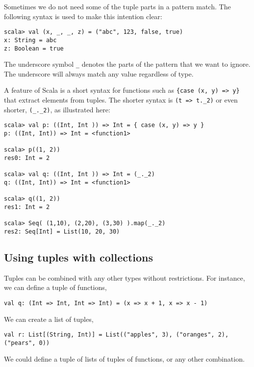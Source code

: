 Sometimes we do not need some of the tuple parts in a pattern match.
The following syntax is used to make this intention clear:
\begin{lstlisting}
scala> val (x, _, _, z) = ("abc", 123, false, true)
x: String = abc
z: Boolean = true
\end{lstlisting}
The underscore symbol \lstinline!_!
denotes the parts of the pattern that we want to ignore. The underscore
will always match any value regardless of type.

A feature of Scala is a short syntax for functions such as \lstinline!{case (x, y) => y}!
that extract elements from tuples. The shorter syntax is \lstinline!(t => t._2)!
or even shorter, \lstinline!(_._2)!,
as illustrated here:
\begin{lstlisting}
scala> val p: ((Int, Int )) => Int = { case (x, y) => y }
p: ((Int, Int)) => Int = <function1>

scala> p((1, 2))
res0: Int = 2

scala> val q: ((Int, Int )) => Int = (_._2)
q: ((Int, Int)) => Int = <function1>

scala> q((1, 2))
res1: Int = 2

scala> Seq( (1,10), (2,20), (3,30) ).map(_._2)
res2: Seq[Int] = List(10, 20, 30)
\end{lstlisting}

\subsection{Using tuples with collections}

Tuples can be combined with any other types without restrictions.
For instance, we can define a tuple of functions,
\begin{lstlisting}
val q: (Int => Int, Int => Int) = (x => x + 1, x => x - 1)
\end{lstlisting}
We can create a list of tuples,
\begin{lstlisting}
val r: List[(String, Int)] = List(("apples", 3), ("oranges", 2), ("pears", 0))
\end{lstlisting}
We could define a tuple of lists of tuples of functions, or any other
combination.

